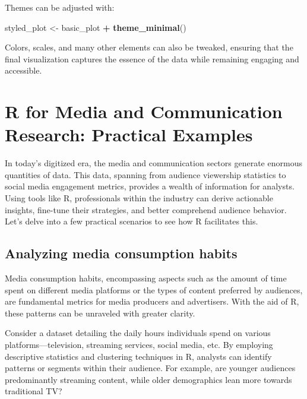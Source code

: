 \documentclass[
  b5paper]{book}
\newenvironment{Shaded}{\begin{snugshade}}{\end{snugshade}}
\newcommand{\FunctionTok}[1]{\textcolor[rgb]{0.13,0.29,0.53}{\textbf{#1}}}
\newcommand{\NormalTok}[1]{#1}
\newcommand{\OtherTok}[1]{\textcolor[rgb]{0.56,0.35,0.01}{#1}}
\newcommand{\SpecialCharTok}[1]{\textcolor[rgb]{0.81,0.36,0.00}{\textbf{#1}}}
\begin{document}
Themes can be adjusted with:

\begin{Shaded}
\begin{Highlighting}[]
\NormalTok{styled\_plot }\OtherTok{\textless{}{-}}\NormalTok{ basic\_plot }\SpecialCharTok{+} \FunctionTok{theme\_minimal}\NormalTok{()}
\end{Highlighting}
\end{Shaded}

Colors, scales, and many other elements can also be tweaked, ensuring that the final visualization captures the essence of the data while remaining engaging and accessible.

\hypertarget{r-for-media-and-communication-research-practical-examples}{%
\section{R for Media and Communication Research: Practical Examples}\label{r-for-media-and-communication-research-practical-examples}}

In today's digitized era, the media and communication sectors generate enormous quantities of data. This data, spanning from audience viewership statistics to social media engagement metrics, provides a wealth of information for analysts. Using tools like R, professionals within the industry can derive actionable insights, fine-tune their strategies, and better comprehend audience behavior. Let's delve into a few practical scenarios to see how R facilitates this.

\hypertarget{analyzing-media-consumption-habits}{%
\subsection*{Analyzing media consumption habits}\label{analyzing-media-consumption-habits}}

Media consumption habits, encompassing aspects such as the amount of time spent on different media platforms or the types of content preferred by audiences, are fundamental metrics for media producers and advertisers. With the aid of R, these patterns can be unraveled with greater clarity.

Consider a dataset detailing the daily hours individuals spend on various platforms---television, streaming services, social media, etc. By employing descriptive statistics and clustering techniques in R, analysts can identify patterns or segments within their audience. For example, are younger audiences predominantly streaming content, while older demographics lean more towards traditional TV?
\end{document}
